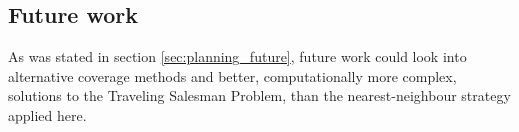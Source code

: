 \subsection{Future work}
As was stated in section \ref{sec:planning_future},
future work could look into alternative coverage methods
and better, computationally more complex, solutions to the Traveling Salesman Problem,
than the nearest-neighbour strategy applied here.
